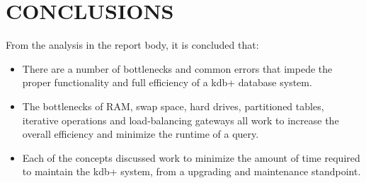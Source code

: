 \section{CONCLUSIONS} %
\label{sec:conclusions}
From the analysis in the report body, it is concluded that:\\

\begin{itemize}
	\item There are a number of bottlenecks and common errors that impede the proper functionality and full efficiency of a kdb+ database system.
	
	\item The bottlenecks of RAM, swap space, hard drives, partitioned tables, iterative operations and load-balancing gateways all work to increase the overall efficiency and minimize the runtime of a query.
	
	\item Each of the concepts discussed work to minimize the amount of time required to maintain the kdb+ system, from a upgrading and maintenance standpoint.
\end{itemize}
